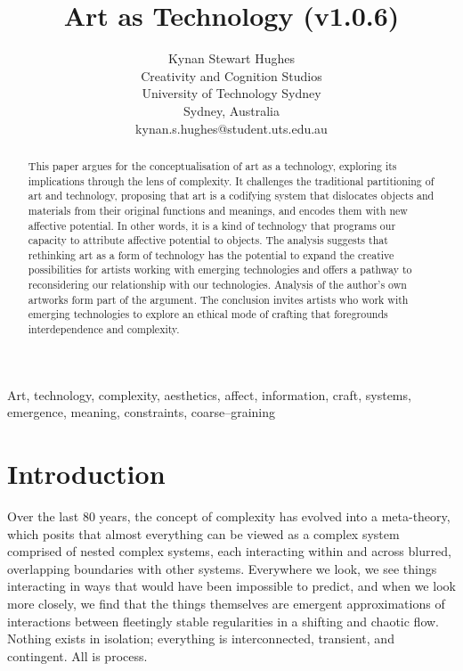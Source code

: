 \documentclass[letter:wpaper]{article}
\title{Art as Technology (v1.0.6)}
\author{Kynan Stewart Hughes\\
Creativity and Cognition Studios\\
University of Technology Sydney\\
Sydney, Australia\\
kynan.s.hughes@student.uts.edu.au\\
\newline
\newline
}
\begin{document}
 
\maketitle
\begin{abstract}

    This paper argues for the conceptualisation of art as a technology, exploring its implications through the lens of complexity. It challenges the traditional partitioning of art and technology, proposing that art is a codifying system that dislocates objects and materials from their original functions and meanings, and encodes them with new affective potential. In other words, it is a kind of technology that programs our capacity to attribute affective potential to objects. The analysis suggests that rethinking art as a form of technology has the potential to expand the creative possibilities for artists working with emerging technologies and offers a pathway to reconsidering our relationship with our technologies. Analysis of the author's own artworks form part of the argument. The conclusion invites artists who work with emerging technologies to explore an ethical mode of crafting that foregrounds interdependence and complexity.

\end{abstract}


Art, technology, complexity, aesthetics, affect, information, craft, systems, emergence, meaning, constraints, coarse–graining

\section{Introduction}

    Over the last 80 years, the concept of complexity has evolved into a meta-theory, which posits that almost everything can be viewed as a complex system comprised of nested complex systems, each interacting within and across blurred, overlapping boundaries with other systems. Everywhere we look, we see things interacting in ways that would have been impossible to predict, and when we look more closely, we find that the things themselves are emergent approximations of interactions between fleetingly stable regularities in a shifting and chaotic flow. Nothing exists in isolation; everything is interconnected, transient, and contingent. All is process.
\end{document}
